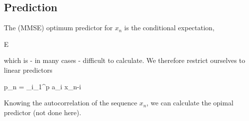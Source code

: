 \subsection{Prediction}

The (MMSE) optimum predictor for $x_n$ is the conditional expectation,

\bee
E 
\eee

which is - in many cases - difficult to calculate. We therefore restrict ourselves to linear predictors

\bee
p_n = \sum_{i_1}^p a_i \hat x_{n-i}
\eee

Knowing the autocorrelation of the sequence $x_n$, we can calculate the opimal predictor (not done here).



